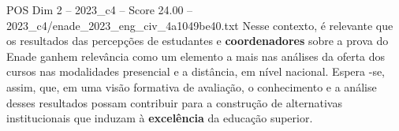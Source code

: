 \begin{textsample}{POS Dim 2 – 2023\_c4 – Score 24.00 – 2023\_c4/enade\_2023\_eng\_civ\_4a1049be40.txt}
Nesse contexto, é relevante que os resultados das percepções de estudantes e \textbf{coordenadores} sobre a prova do Enade ganhem relevância como um elemento a mais nas análises da oferta dos cursos nas modalidades presencial e a distância, em nível nacional.
Espera -se, assim, que, em uma visão formativa de avaliação, o conhecimento e a análise desses resultados possam contribuir para a construção de alternativas institucionais que induzam à \textbf{excelência} da educação superior.

\end{textsample}
